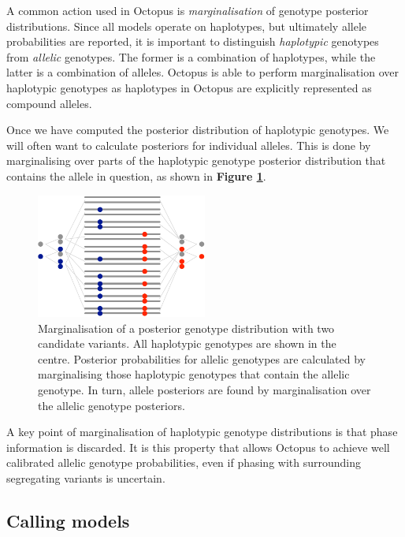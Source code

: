 \documentclass[notitlepage, twocolumn]{article}
\begin{document}
A common action used in Octopus is \emph{marginalisation} of genotype posterior distributions. Since all models operate on haplotypes, but ultimately allele probabilities are reported, it is important to distinguish \emph{haplotypic} genotypes from \emph{allelic} genotypes. The former is a combination of haplotypes, while the latter is a combination of alleles. Octopus is able to perform marginalisation over haplotypic genotypes as haplotypes in Octopus are explicitly represented as compound alleles.

Once we have computed the posterior distribution of haplotypic genotypes. We will often want to calculate posteriors for individual alleles. This is done by marginalising over parts of the haplotypic genotype posterior distribution that contains the allele in question, as shown in \textbf{Figure \ref{fig:marginalisation}}.

\begin{figure}[ht]
\centering
\includegraphics[width=0.5\textwidth]{figures/marginalisation}
\caption{Marginalisation of a posterior genotype distribution with two candidate variants. All haplotypic genotypes are shown in the centre. Posterior probabilities for allelic genotypes are calculated by marginalising those haplotypic genotypes that contain the allelic genotype. In turn, allele posteriors are found by marginalisation over the allelic genotype posteriors.}
\label{fig:marginalisation}
\vspace{-1.5em}
\end{figure}

A key point of marginalisation of haplotypic genotype distributions is that phase information is discarded. It is this property that allows Octopus to achieve well calibrated allelic genotype probabilities, even if phasing with surrounding segregating variants is uncertain.

\subsection*{Calling models}
\end{document}
